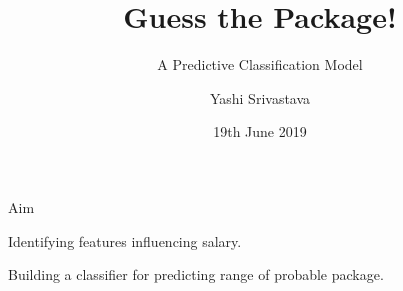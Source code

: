 \documentclass[14pt]{beamer}
\title{Guess the Package!}
\subtitle{A Predictive Classification Model}
\author{Yashi Srivastava}
\institute{Talentsprint}
\date{19th June 2019}
\begin{document}
\begin{frame}[plain]
\maketitle
\end{frame}

\begin{frame}{Aim}
 \begin{fullpageitemize}
  \item \begin{center}Identifying features influencing salary.\end{center}
  \pause
  \item \begin{center}Building a classifier for predicting range of probable package.\end{center}
 \end{fullpageitemize}
\end{frame}
\end{document}

